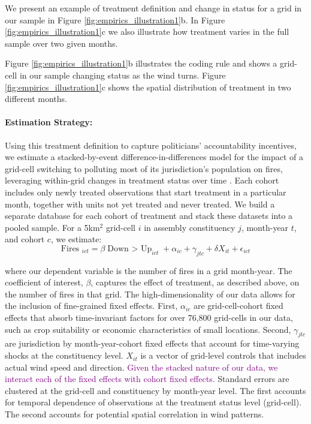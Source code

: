 \documentclass[12pt]{article}
\begin{document}
We present an example of treatment definition and change in status for a grid in our sample in Figure \ref{fig:empirics_illustration1}b. In Figure \ref{fig:empirics_illustration1}c we also illustrate how treatment varies in the full sample over two given months. 

Figure \ref{fig:empirics_illustration1}b illustrates the coding rule and shows a grid-cell in our sample changing status as the wind turns. Figure \ref{fig:empirics_illustration1}c shows the spatial distribution of treatment in two different months. 

\paragraph{Estimation Strategy:}
Using this treatment definition to capture politicians' accountability incentives, we estimate a stacked-by-event difference-in-differences model for the impact of a grid-cell switching to polluting most of its jurisdiction's population on fires, leveraging within-grid changes in treatment status over time \citep{cengiz2019effect}. Each cohort includes only newly treated observations that start treatment in a particular month, together with units not yet treated and never treated. We build a separate database for each cohort of treatment and stack these datasets into a pooled sample. For a 5km$^2$ grid-cell $i$ in assembly constituency $j$, month-year $t$, and cohort $c$, we estimate:
\begin{equation}\label{eq1}
 \text{Fires }_{ict}=\beta \text{{Down $>$ Up}}_{ict}+ \alpha_{ic}+ \gamma_{jtc} + \delta X_{it} + \epsilon_{ict}
\end{equation}

where our dependent variable is the number of fires in a grid month-year. The coefficient of interest, $\beta$, captures the effect of treatment, as described above, on the number of fires in that grid. 
The high-dimensionality of our data allows for the inclusion of fine-grained fixed effects. First, $\alpha_{ic}$ are grid-cell-cohort fixed effects that absorb time-invariant factors for over 76,800 grid-cells in our data, such as crop suitability or economic characteristics of small locations.  Second,  $\gamma_{jtc}$ are jurisdiction by month-year-cohort fixed effects that account for time-varying shocks at the constituency level. $X_{it}$ is a vector of grid-level controls that includes actual wind speed and direction. \textcolor{purple}{Given the stacked nature of our data, we interact each of the fixed effects with cohort fixed effects. } Standard errors are clustered at the grid-cell and constituency by month-year level. The first accounts for temporal dependence of observations at the treatment status level (grid-cell). The second accounts for potential spatial correlation in wind patterns. 
\end{document}
